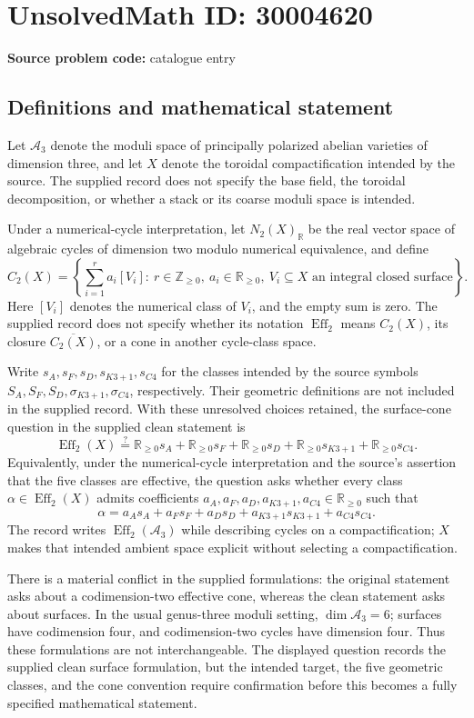 \documentclass[11pt]{article}
\newcommand{\Z}{\mathbb{Z}}
\newcommand{\R}{\mathbb{R}}
\begin{document}
\section*{UnsolvedMath ID: 30004620}
\textbf{Source problem code:} catalogue entry
\subsection{Definitions and mathematical statement}
Let \(\mathcal A_3\) denote the moduli space of principally polarized abelian varieties of dimension three, and let \(X\) denote the toroidal compactification intended by the source. The supplied record does not specify the base field, the toroidal decomposition, or whether a stack or its coarse moduli space is intended.

Under a numerical-cycle interpretation, let \(N_2(X)_{\R}\) be the real vector space of algebraic cycles of dimension two modulo numerical equivalence, and define
\[
C_2(X)=\left\{\sum_{i=1}^{r}a_i[V_i]:\ r\in\Z_{\geq0},\ a_i\in\R_{\geq0},\ V_i\subseteq X\text{ an integral closed surface}\right\}.
\]
Here \([V_i]\) denotes the numerical class of \(V_i\), and the empty sum is zero. The supplied record does not specify whether its notation \(\operatorname{Eff}_2\) means \(C_2(X)\), its closure \(\overline{C_2(X)}\), or a cone in another cycle-class space.

Write \(s_A,s_F,s_D,s_{K3+1},s_{C4}\) for the classes intended by the source symbols \(S_A,S_F,S_D,\sigma_{K3+1},\sigma_{C4}\), respectively. Their geometric definitions are not included in the supplied record. With these unresolved choices retained, the surface-cone question in the supplied clean statement is
\[
\operatorname{Eff}_2(X)\stackrel{?}{=}
\R_{\geq0}s_A+
\R_{\geq0}s_F+
\R_{\geq0}s_D+
\R_{\geq0}s_{K3+1}+
\R_{\geq0}s_{C4}.
\]
Equivalently, under the numerical-cycle interpretation and the source's assertion that the five classes are effective, the question asks whether every class \(\alpha\in\operatorname{Eff}_2(X)\) admits coefficients \(a_A,a_F,a_D,a_{K3+1},a_{C4}\in\R_{\geq0}\) such that
\[
\alpha=a_As_A+a_Fs_F+a_Ds_D+a_{K3+1}s_{K3+1}+a_{C4}s_{C4}.
\]
The record writes \(\operatorname{Eff}_2(\mathcal A_3)\) while describing cycles on a compactification; \(X\) makes that intended ambient space explicit without selecting a compactification.

There is a material conflict in the supplied formulations: the original statement asks about a codimension-two effective cone, whereas the clean statement asks about surfaces. In the usual genus-three moduli setting, \(\dim\mathcal A_3=6\); surfaces have codimension four, and codimension-two cycles have dimension four. Thus these formulations are not interchangeable. The displayed question records the supplied clean surface formulation, but the intended target, the five geometric classes, and the cone convention require confirmation before this becomes a fully specified mathematical statement.
\end{document}
